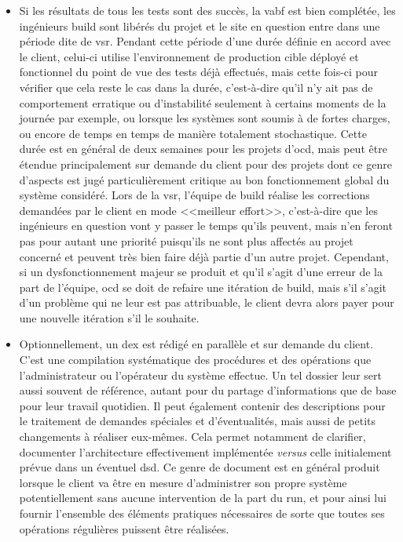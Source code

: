 \documentclass[12pt, oneside, a4paper, titlepage]{report}
\begin{document}
\begin{itemize}
    \item Si les résultats de tous les tests sont des succès, la \gls{vabf} est
        bien complétée, les ingénieurs \gls{build} sont libérés du projet et le
        site en question entre dans une période dite de \gls{vsr}. Pendant cette
        période d'une durée définie en accord avec le client, celui-ci utilise
        l'environnement de production cible déployé et fonctionnel du point de
        vue des tests déjà effectués, mais cette fois-ci pour vérifier que cela
        reste le cas dans la durée, c'est-à-dire qu'il n'y ait pas de
        comportement erratique ou d'instabilité seulement à certains moments de
        la journée par exemple, ou lorsque les systèmes sont soumis à de fortes
        charges, ou encore de temps en temps de manière totalement stochastique.
        Cette durée est en général de deux semaines pour les projets
        d'\acrlong{ocd}, mais peut être étendue principalement sur demande du
        client pour des projets dont ce genre d'aspects est jugé
        particulièrement critique au bon fonctionnement global du système
        considéré. Lors de la \gls{vsr}, l'équipe de \gls{build} réalise les
        corrections demandées par le client en mode <<meilleur effort>>,
        c'est-à-dire que les ingénieurs en question vont y passer le temps
        qu'ils peuvent, mais n'en feront pas pour autant une priorité puisqu'ils
        ne sont plus affectés au projet concerné et peuvent très bien faire déjà
        partie d'un autre projet. Cependant, si un dysfonctionnement majeur se
        produit et qu'il s'agit d'une erreur de la part de l'équipe, \gls{ocd}
        se doit de refaire une itération de \gls{build}, mais s'il s'agit d'un
        problème qui ne leur est pas attribuable, le client devra alors payer
        pour une nouvelle itération s'il le souhaite.

    \item Optionnellement, un \gls{dex} est rédigé en parallèle et sur demande
        du client. C'est une compilation systématique des procédures et des
        opérations que l'administrateur ou l'opérateur du système effectue. Un
        tel dossier leur sert aussi souvent de référence, autant pour du partage
        d'informations que de base pour leur travail quotidien. Il peut
        également contenir des descriptions pour le traitement de demandes
        spéciales et d'éventualités, mais aussi de petits changements à réaliser
        eux-mêmes. Cela permet notamment de clarifier, documenter l'architecture
        effectivement implémentée \textit{versus} celle initialement prévue dans
        un éventuel \gls{dsd}. Ce genre de document est en général produit
        lorsque le client va être en mesure d'administrer son propre système
        potentiellement sans aucune intervention de la part du \gls{run}, et
        pour ainsi lui fournir l'ensemble des éléments pratiques nécessaires de
        sorte que toutes ses opérations régulières puissent être réalisées.


\end{itemize}
\end{document}
